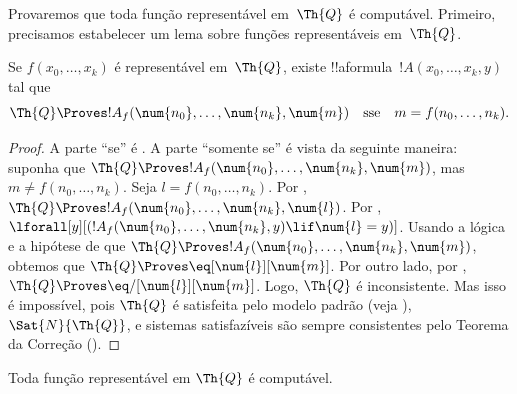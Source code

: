 \documentclass[../../../include/open-logic-section]{subfiles}
\begin{document}

Provaremos que toda função representável em~$\Th{Q}$ é computável.
Primeiro, precisamos estabelecer um lema sobre funções representáveis
em~$\Th{Q}$.

\begin{lem}
  Se $f(x_0,
  \dots, x_k)$ é representável em~$\Th{Q}$, existe
  !!a{formula}~$!A(x_0, \dots, x_k, y)$ tal que
  \[
  \Th{Q} \Proves !A_f(\num{n_0}, \dots, \num{n_k}, \num{m})
  \quad\text{sse}\quad m = f(n_0, \dots, n_k).
  \]
\end{lem}

\begin{proof}
  A parte ``se'' é
. A parte
``somente se'' é vista da seguinte maneira: suponha que
$\Th{Q} \Proves !A_f(\num{n_0}, \dots, \num{n_k}, \num{m})$, mas
$m \neq f(n_0, \dots, n_k)$. Seja $l = f(n_0, \dots, n_k)$. Por
, $\Th{Q}
\Proves !A_f(\num{n_0}, \dots, \num{n_k}, \num{l})$. Por
,
$\lforall[y][(!A_f(\num{n_0}, \dots, \num{n_k}, y) \lif \num{l} =
y)]$. Usando a lógica e a hipótese de que $\Th{Q} \Proves
!A_f(\num{n_0}, \dots, \num{n_k}, \num{m})$, obtemos que $\Th{Q}
\Proves \eq[\num{l}][\num{m}]$. Por outro lado, por
, $\Th{Q} \Proves
\eq/[\num{l}][\num{m}]$. Logo, $\Th{Q}$ é inconsistente. Mas isso é
impossível, pois $\Th{Q}$ é satisfeita pelo modelo padrão (veja
), $\Sat{N}{\Th{Q}}$, e
sistemas satisfazíveis são sempre consistentes pelo Teorema da Correção
().
\end{proof}

\begin{lem}
Toda função representável em $\Th{Q}$ é computável.
\end{lem}
\end{document}
